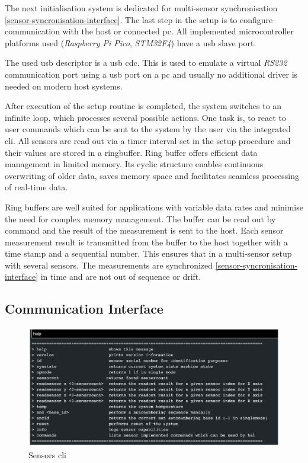 The next initialisation system is dedicated for multi-sensor
synchronisation \ref{sensor-syncronisation-interface}. The last step in
the setup is to configure communication with the host or connected
\gls{pc}. All implemented microcontroller platforms used
(\emph{Raspberry Pi Pico}, \emph{STM32F4}) have a \gls{usb} slave port.

The used usb descriptor is a \gls{usb} \gls{cdc}. This is used to
emulate a virtual \emph{RS232} communication port using a \gls{usb} port
on a \gls{pc} and usually no additional driver is needed on modern host
systems.

After execution of the setup routine is completed, the system switches
to an infinite loop, which processes several possible actions. One task
is, to react to user commands which can be sent to the system by the
user via the integrated \gls{cli}. All sensors are read out via a timer
interval set in the setup procedure and their values are stored in a
ringbuffer. Ring buffer offers efficient data management in limited
memory. Its cyclic structure enables continuous overwriting of older
data, saves memory space and facilitates seamless processing of
real-time data.

Ring buffers are well suited for applications with variable data rates
and minimise the need for complex memory management. The buffer can be
read out by command and the result of the measurement is sent to the
host. Each sensor measurement result is transmitted from the buffer to
the host together with a time stamp and a sequential number. This
ensures that in a multi-sensor setup with several sensors. The
measurements are synchronized \ref{sensor-syncronisation-interface} in
time and are not out of sequence or drift.

\hypertarget{communication-interface}{%
\subsection{Communication Interface}\label{communication-interface}}

\begin{figure}
\centering
\includegraphics{./generated_images/border_Sensors_(+cli).png}
\caption{Sensors \gls{cli} \label{Sensors_(+cli).png}}
\end{figure}


